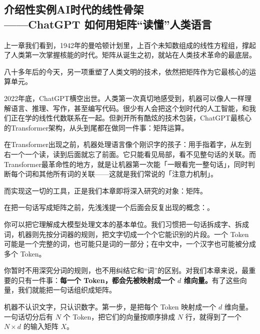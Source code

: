 \documentclass[a4paper,12pt,twoside,openany,fontset=none]{ctexbook}
\numberwithin{equation}{chapter}
\begin{document}
\subsection*{介绍性实例\quad AI时代的线性骨架\\[4pt]——ChatGPT 如何用矩阵“读懂”人类语言}

上一章我们看到，1942年的曼哈顿计划里，上百个未知数组成的线性方程组，撑起了人类第一次掌握核能的时代。矩阵从诞生之初，就站在人类技术革命的最底层。

八十多年后的今天，另一项重塑了人类文明的技术，依然把矩阵作为它最核心的运算单元。

2022年底，ChatGPT横空出世。人类第一次真切地感受到，机器可以像人一样理解语言、推理、写作，甚至编写代码。很少有人会把这个划时代的人工智能，和我们正在学的线性代数联系在一起。但剥开所有酷炫的技术包装，ChatGPT最核心的Transformer架构，从头到尾都在做同一件事：矩阵运算。

在Transformer出现之前，机器处理语言像个刚识字的孩子：用手指着字，从左到右一个一个读，读到后面就忘了前面。它只能看见局部，看不见整句话的关联。而Transformer最革命性的地方，就是让机器第一次能「一眼看完一整句话」，同时判断每个词和其他所有词的关联——这就是我们常说的「注意力机制」。

而实现这一切的工具，正是我们本章即将深入研究的对象：矩阵。


在把一句话写成矩阵之前，先浅浅提一个后面会反复出现的概念：\textbf{}。

你可以把它理解成大模型处理文本的基本单位。我们习惯把一句话拆成字、拆成词，机器则先按分词器的规则，把文字切成一个个它能识别的片段。一个 Token 可能是一个完整的词，也可能只是词的一部分；在中文中，一个汉字也可能被分成多个 Token。

你暂时不用深究分词的规则，也不用纠结它和“词”的区别。对我们本章来说，最重要的只有一件事：\textbf{每一个 Token，都会先被映射成一个 $d$ 维向量。}有了这些向量，我们就能把一句话组织成矩阵。

\clearpage

机器不认识文字，只认识数字。第一步，是把每个 Token 映射成一个 $d$ 维向量。一句话切分后有 $N$ 个 Token，把它们的向量按顺序排成 $N$ 行，就得到了一个 $N\times d$ 的输入矩阵 $X$。
\end{document}
